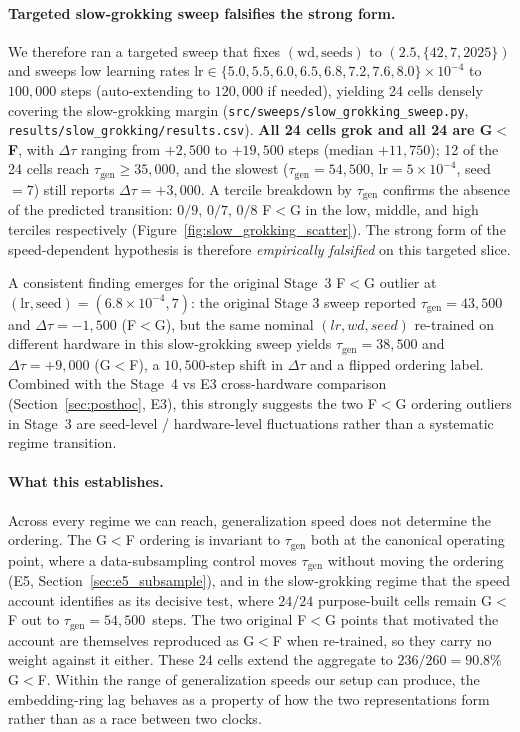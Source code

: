 \documentclass{article}
\newcommand{\taug}{\tau_{\mathrm{gen}}}
\newcommand{\Dtau}{\Delta\tau}
\begin{document}
\paragraph{Targeted slow-grokking sweep falsifies the strong
form.}
We therefore ran a targeted sweep that fixes
$(\mathrm{wd}, \text{seeds})$ to $(2.5, \{42, 7, 2025\})$ and
sweeps low learning rates
$\mathrm{lr}\in\{5.0, 5.5, 6.0, 6.5, 6.8, 7.2, 7.6, 8.0\}\times10^{-4}$
to $100{,}000$ steps (auto-extending to $120{,}000$ if needed),
yielding 24 cells densely covering the slow-grokking margin
(\texttt{src/sweeps/slow\_grokking\_sweep.py},
\texttt{results/slow\_grokking/results.csv}).
\textbf{All 24 cells grok and all 24 are G$<$F}, with $\Dtau$
ranging from $+2{,}500$ to $+19{,}500$ steps (median $+11{,}750$);
12 of the 24 cells reach $\taug\geq 35{,}000$, and the slowest
($\taug=54{,}500$, lr$=5\!\times\!10^{-4}$, seed$=7$) still
reports $\Dtau=+3{,}000$.
A tercile breakdown by $\taug$ confirms the absence of the
predicted transition: $0/9$, $0/7$, $0/8$ F$<$G in the low,
middle, and high terciles respectively
(Figure~\ref{fig:slow_grokking_scatter}).
The strong form of the speed-dependent hypothesis is therefore
\emph{empirically falsified} on this targeted slice.

A consistent finding emerges for the original Stage~3 F$<$G
outlier at $(\mathrm{lr},\mathrm{seed})=(6.8\!\times\!10^{-4}, 7)$:
the original Stage 3 sweep reported $\taug=43{,}500$ and
$\Dtau=-1{,}500$ (F$<$G), but the same nominal $(lr, wd, seed)$
re-trained on different hardware in this slow-grokking sweep
yields $\taug=38{,}500$ and $\Dtau=+9{,}000$ (G$<$F), a
$10{,}500$-step shift in $\Dtau$ and a flipped ordering label.
Combined with the Stage~4 vs E3 cross-hardware comparison
(Section~\ref{sec:posthoc}, E3), this strongly suggests the
two F$<$G ordering outliers in Stage~3 are seed-level / hardware-level
fluctuations rather than a systematic regime transition.

\paragraph{What this establishes.}
Across every regime we can reach, generalization speed does not
determine the ordering.
The G$<$F ordering is invariant to $\taug$ both at the canonical
operating point, where a data-subsampling control moves $\taug$
without moving the ordering (E5,
Section~\ref{sec:e5_subsample}), and in the slow-grokking regime
that the speed account identifies as its decisive test, where
$24/24$ purpose-built cells remain G$<$F out to
$\taug{=}54{,}500$~steps.
The two original F$<$G points that motivated the account are
themselves reproduced as G$<$F when re-trained, so they carry no
weight against it either.
These 24 cells extend the aggregate to $236/260{=}90.8\%$ G$<$F.
Within the range of generalization speeds our setup can produce,
the embedding-ring lag behaves as a property of how the two
representations form rather than as a race between two clocks.
\end{document}
